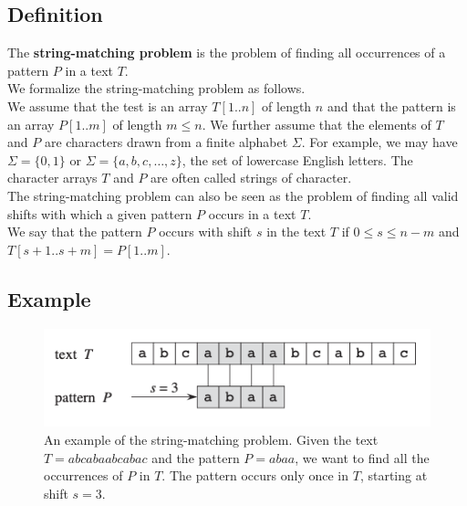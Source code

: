 \documentclass[11pt]{article}
\begin{document}
        \subsection{Definition} \label{subsec:definition}

            The \textbf{string-matching problem} is the problem of finding all occurrences of a pattern $P$ in a text $T$. \\

            \noindent We formalize the string-matching problem as follows. \\
            We assume that the test is an array $T[1..n]$ of length $n$ and that the pattern is an array $P[1..m]$ of length $m \leq n$.
            We further assume that the elements of $T$ and $P$ are characters drawn from a finite alphabet $\Sigma$.
            For example, we may have $\Sigma = \{0, 1\}$ or $\Sigma = \{a, b, c, \dots, z\}$, the set of lowercase English letters.
            The character arrays $T$ and $P$ are often called strings of character. \\

            \noindent The string-matching problem can also be seen as the problem of finding all valid shifts with which a given pattern $P$ occurs in a text $T$. \\
            We say that the pattern $P$ occurs with shift $s$ in the text $T$ if $0 \leq s \leq n - m$ and $T[s+1..s+m] = P[1..m]$.

        \subsection{Example} \label{subsec:example}

            \begin{figure}[H]
                \centering
                \includegraphics[width = 0.7 \textwidth]{Figure 2.1}
                \caption{An example of the string-matching problem.
                         Given the text $T = abcabaabcabac$ and the pattern $P = abaa$, we want to find all the occurrences of $P$ in $T$.
                         The pattern occurs only once in $T$, starting at shift $s = 3$.}
                \label{fig:example}
            \end{figure}
\end{document}
